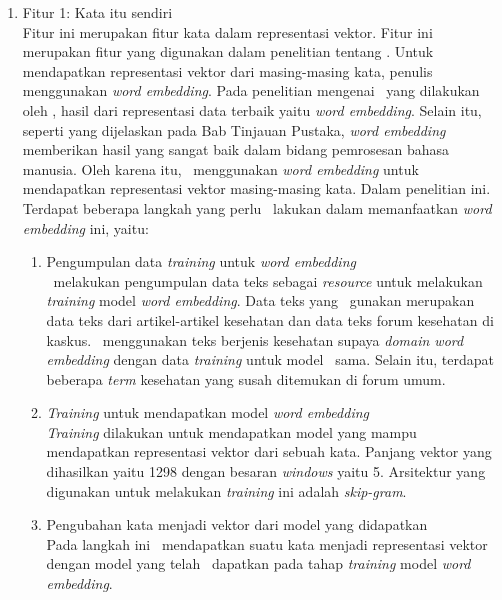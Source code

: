 \begin{enumerate}
	\item Fitur 1: Kata itu sendiri\\
	Fitur ini merupakan fitur kata dalam representasi vektor. Fitur ini merupakan fitur yang digunakan \cite{abacha2011medical} dalam penelitian tentang \mer. Untuk mendapatkan representasi vektor dari masing-masing kata, penulis menggunakan \textit{word embedding}. Pada penelitian mengenai \mer~yang dilakukan oleh \cite{mujiono2016new}, hasil dari representasi data terbaik yaitu \textit{word embedding}. Selain itu, seperti yang dijelaskan pada Bab Tinjauan Pustaka, \textit{word embedding} memberikan hasil yang sangat baik dalam bidang pemrosesan bahasa manusia. Oleh karena itu, \saya~menggunakan \textit{word embedding} untuk mendapatkan representasi vektor masing-masing kata. Dalam penelitian ini. Terdapat beberapa langkah yang perlu \saya~lakukan dalam memanfaatkan \textit{word embedding} ini, yaitu:
	\begin{enumerate}
		\item Pengumpulan data \textit{training} untuk \textit{word embedding}\\
		\Saya~melakukan pengumpulan data teks sebagai \textit{resource} untuk melakukan \textit{training} model \textit{word embedding}. Data teks yang \saya~gunakan merupakan data teks dari artikel-artikel kesehatan dan data teks forum kesehatan di kaskus. \Saya~menggunakan teks berjenis kesehatan supaya \textit{domain word embedding} dengan data \textit{training} untuk model \mer~sama. Selain itu, terdapat beberapa \textit{term} kesehatan yang susah ditemukan di forum umum.
		 
		\item \textit{Training} untuk mendapatkan model \textit{word embedding}\\
		\textit{Training} dilakukan untuk mendapatkan model yang mampu mendapatkan representasi vektor dari sebuah kata. Panjang vektor yang dihasilkan yaitu 1298 dengan besaran \textit{windows} yaitu 5. Arsitektur yang digunakan untuk melakukan \textit{training} ini adalah \textit{skip-gram}.
		
		\item Pengubahan kata menjadi vektor dari model yang didapatkan\\
		Pada langkah ini \saya~mendapatkan suatu kata menjadi representasi vektor dengan model yang telah \saya~dapatkan pada tahap \textit{training} model \textit{word embedding}.
	\end{enumerate}
	

\end{enumerate}
